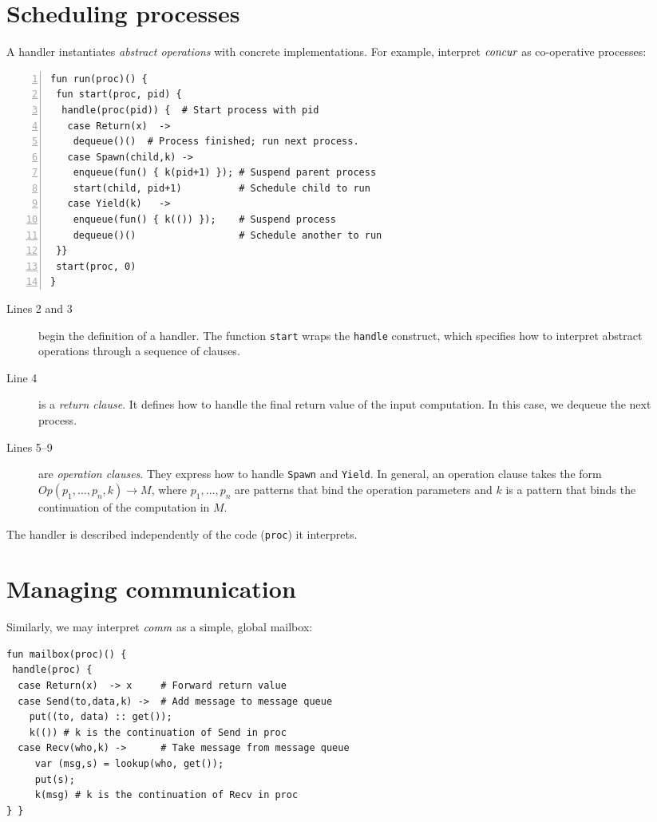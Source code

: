 \documentclass[noback,landscape]{infposter}
\begin{document}
\section{Scheduling processes}
A handler instantiates \emph{abstract operations} with concrete
implementations. For example, interpret $\emph{concur}$ as
co-operative processes:
\begin{lstlisting}[numbers=left]
fun run(proc)() {
 fun start(proc, pid) {
  handle(proc(pid)) {  # Start process with pid
   case Return(x)  -> 
    dequeue()()  # Process finished; run next process.
   case Spawn(child,k) -> 
    enqueue(fun() { k(pid+1) }); # Suspend parent process
    start(child, pid+1)          # Schedule child to run
   case Yield(k)   -> 
    enqueue(fun() { k(()) });    # Suspend process
    dequeue()()                  # Schedule another to run
 }}
 start(proc, 0)
}
\end{lstlisting}
\begin{description}
\item[Lines 2 and 3] begin the definition of a handler. The function
  \lstinline$start$ wraps the \lstinline$handle$ construct, which
  specifies how to interpret abstract operations through a sequence of
  clauses.

\item[Line 4] is a \emph{return clause}. It defines how to handle the
  final return value of the input computation. In this case, we
  dequeue the next process.

\item[Lines 5--9] are \emph{operation clauses}. They express how to
  handle \lstinline$Spawn$ and \lstinline$Yield$. In general, an
  operation clause takes the form $Op(p_1,\dots,p_n,k) \to M$, where
  $p_1,\dots,p_n$ are patterns that bind the operation parameters and
  $k$ is a pattern that binds the continuation of the computation in
  $M$.
\end{description}

The handler is described independently of the code (\lstinline$proc$)
it interprets.
\vfill

\section{Managing communication}
Similarly, we may interpret $\emph{comm}$ as a simple, global mailbox:
\begin{lstlisting}
fun mailbox(proc)() {
 handle(proc) {
  case Return(x)  -> x     # Forward return value
  case Send(to,data,k) ->  # Add message to message queue
    put((to, data) :: get()); 
    k(()) # k is the continuation of Send in proc
  case Recv(who,k) ->      # Take message from message queue
     var (msg,s) = lookup(who, get());
     put(s);
     k(msg) # k is the continuation of Recv in proc
} }
\end{lstlisting}
\end{document}
